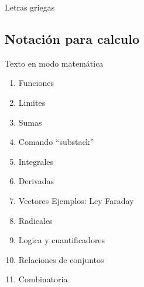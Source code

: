 \documentclass[../slides.tex]{subfiles}
\begin{document}
    \begin{frame}{Letras griegas}
    \end{frame} 
    
    \subsection{Notación para calculo}

    \begin{frame}{Texto en modo matemática}
    \end{frame}
        \begin{enumerate}
        \item{Funciones}
        \item{Limites}
        \item{Sumas}
            \item{Comando ``substack''}
        \item{Integrales}
        \item{Derivadas}
        \item{Vectores}
            Ejemplos: Ley Faraday
    
        \item{Radicales}
        
        \item{Logica y cuantificadores}
        
        \item{Relaciones de conjuntos}
        
        \item{Combinatoria} 
        \end{enumerate}
\end{document}
